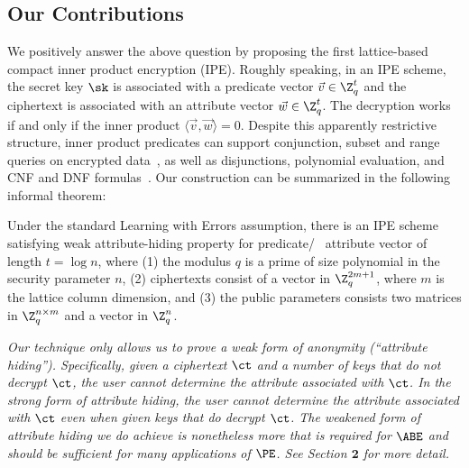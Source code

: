 \subsection{Our Contributions}
We positively answer the above question by proposing the first lattice-based compact inner product encryption (IPE). Roughly speaking, in an IPE scheme, the secret key $\sk$ is associated with a predicate vector $\vec{v} \in \Z_q^t$ and the ciphertext is associated with an attribute vector $\vec{w} \in \Z_q^t$. The decryption works if and only if the inner product $\langle \vec{v}, \vec{w} \rangle = 0$. Despite this apparently restrictive structure, inner product predicates can support conjunction, subset and range queries on encrypted data~\cite{TCC:BonWat07}, as well as disjunctions, polynomial evaluation, and CNF and DNF formulas~\cite{EC:KatSahWat08}. Our construction can be summarized in the following informal theorem:
\begin{theorem}[Main]
Under the standard Learning with Errors assumption, there is an IPE scheme satisfying weak attribute-hiding property for predicate/ \ attribute vector of length $t = \log n$, where (1) the modulus $q$ is a prime of size polynomial in the security parameter $n$, (2) ciphertexts consist of a vector in $\Z_q^{2m + 1}$, where $m$ is the lattice column dimension, and (3) the public parameters consists two matrices in $\Z_q^{n \times m}$ and a vector in $\Z_q^n$.
\end{theorem}

\begin{remark}\label{rem:sec}
\emph{
Our technique only allows us to prove a weak form of anonymity (``attribute hiding''). Specifically, given a ciphertext $\ct$ and a number of keys that do not decrypt $\ct$, the user cannot determine the attribute associated with $\ct$. In the strong form of attribute hiding, the user cannot determine the attribute associated with $\ct$ even when given keys that do decrypt $\ct$. The weakened form of attribute hiding we do achieve is nonetheless more that is required for $\ABE$ and should be sufficient for many applications of $\PE$. See Section $\textbf{2}$ for more detail.
}
\end{remark}

